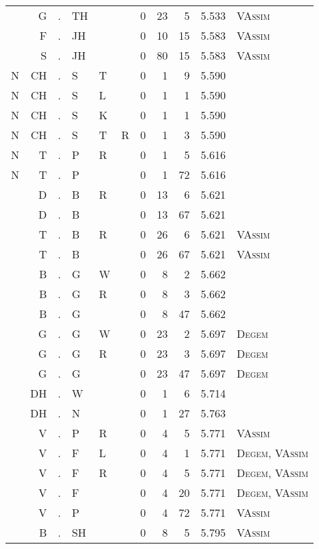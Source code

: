 \begin{longtable}{r@{ } r@{ } c@{ } l@{ } l@{ } l@{ } r r r r l }
  & G & . & TH &   &   & 0 & 23 & 5 & 5.533 & \textsc{VAssim} \\
  & F & . & JH &   &   & 0 & 10 & 15 & 5.583 & \textsc{VAssim} \\
  & S & . & JH &   &   & 0 & 80 & 15 & 5.583 & \textsc{VAssim} \\
N & CH & . & S & T &   & 0 & 1 & 9 & 5.590 &  \\
N & CH & . & S & L &   & 0 & 1 & 1 & 5.590 &  \\
N & CH & . & S & K &   & 0 & 1 & 1 & 5.590 &  \\
N & CH & . & S & T & R & 0 & 1 & 3 & 5.590 &  \\
N & T & . & P & R &   & 0 & 1 & 5 & 5.616 &  \\
N & T & . & P &   &   & 0 & 1 & 72 & 5.616 &  \\
  & D & . & B & R &   & 0 & 13 & 6 & 5.621 &  \\
  & D & . & B &   &   & 0 & 13 & 67 & 5.621 &  \\
  & T & . & B & R &   & 0 & 26 & 6 & 5.621 & \textsc{VAssim} \\
  & T & . & B &   &   & 0 & 26 & 67 & 5.621 & \textsc{VAssim} \\
  & B & . & G & W &   & 0 & 8 & 2 & 5.662 &  \\
  & B & . & G & R &   & 0 & 8 & 3 & 5.662 &  \\
  & B & . & G &   &   & 0 & 8 & 47 & 5.662 &  \\
  & G & . & G & W &   & 0 & 23 & 2 & 5.697 & \textsc{Degem} \\
  & G & . & G & R &   & 0 & 23 & 3 & 5.697 & \textsc{Degem} \\
  & G & . & G &   &   & 0 & 23 & 47 & 5.697 & \textsc{Degem} \\
  & DH & . & W &   &   & 0 & 1 & 6 & 5.714 &  \\
  & DH & . & N &   &   & 0 & 1 & 27 & 5.763 &  \\
  & V & . & P & R &   & 0 & 4 & 5 & 5.771 & \textsc{VAssim} \\
  & V & . & F & L &   & 0 & 4 & 1 & 5.771 & \textsc{Degem}, \textsc{VAssim} \\
  & V & . & F & R &   & 0 & 4 & 5 & 5.771 & \textsc{Degem}, \textsc{VAssim} \\
  & V & . & F &   &   & 0 & 4 & 20 & 5.771 & \textsc{Degem}, \textsc{VAssim} \\
  & V & . & P &   &   & 0 & 4 & 72 & 5.771 & \textsc{VAssim} \\
  & B & . & SH &   &   & 0 & 8 & 5 & 5.795 & \textsc{VAssim} \\

\end{longtable}
